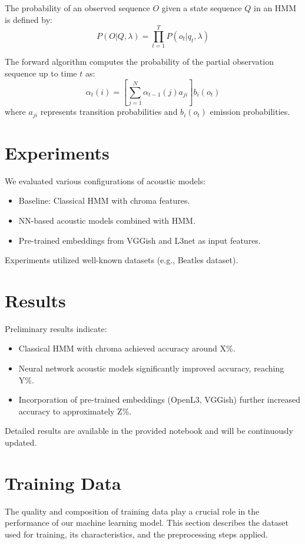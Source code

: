 \documentclass{article}
\begin{document}
The probability of an observed sequence $O$ given a state sequence $Q$ in an HMM is defined by:
\begin{equation}
P(O|Q,\lambda) = \prod_{t=1}^{T} P(o_t|q_t,\lambda)
\end{equation}

The forward algorithm computes the probability of the partial observation sequence up to time $t$ as:
\begin{equation}
\alpha_t(i) = \left[\sum_{j=1}^{N}\alpha_{t-1}(j)a_{ji}\right] b_i(o_t)
\end{equation}
where $a_{ji}$ represents transition probabilities and $b_i(o_t)$ emission probabilities.

\section{Experiments}
We evaluated various configurations of acoustic models:
\begin{itemize}
    \item Baseline: Classical HMM with chroma features.
    \item NN-based acoustic models combined with HMM.
    \item Pre-trained embeddings from VGGish and L3net as input features.
\end{itemize}
Experiments utilized well-known datasets (e.g., Beatles dataset).

\section{Results}
Preliminary results indicate:
\begin{itemize}
    \item Classical HMM with chroma achieved accuracy around X\%.
    \item Neural network acoustic models significantly improved accuracy, reaching Y\%.
    \item Incorporation of pre-trained embeddings (OpenL3, VGGish) further increased accuracy to approximately Z\%.
\end{itemize}
Detailed results are available in the provided notebook and will be continuously updated.

\section{Training Data}
\label{sec:training_data}

The quality and composition of training data play a crucial role in the performance of our machine learning model. This section describes the dataset used for training, its characteristics, and the preprocessing steps applied.
\end{document}
